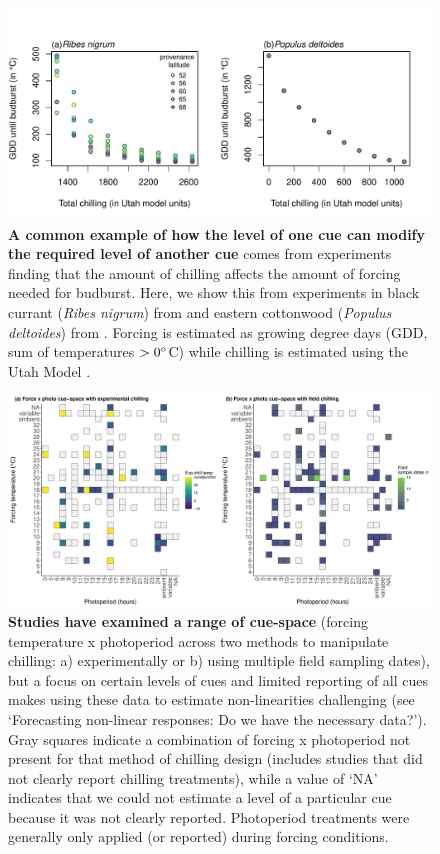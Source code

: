 \documentclass[11pt,letter]{article}
\begin{document}
\clearpage
\begin{figure}
\centering
\includegraphics[width=1\textwidth]{..//..//analyses/limitingcues/figures/gddbyutahpretty.pdf}
\caption{{\bf A common example of how the level of one cue can modify the required level of another cue} comes from experiments finding that the amount of chilling affects the amount of forcing needed for budburst. Here, we show this from experiments in black currant (\emph{Ribes nigrum}) from \citet{Sonsteby:2014aa} and eastern cottonwood (\emph{Populus deltoides}) from \citet{Thielges:1976aa}. Forcing is estimated as growing degree days (GDD, sum of temperatures $>0\degree$C) while chilling is estimated using the Utah Model \citep[see][]{richardson1974}.} %
  \label{fig:gddbyutah} 
\end{figure}


\clearpage
\begin{figure}[t!]
\centering
\includegraphics[width=1.1\textwidth]{..//..//analyses/limitingcues/figures/heatmapphotoxforcexchill2panel.pdf}
\caption{{\bf Studies have examined a range of cue-space} (forcing temperature x photoperiod across two methods to manipulate chilling: a) experimentally or b) using multiple field sampling dates), but a focus on certain levels of cues and limited reporting of all cues makes using these data to estimate non-linearities challenging (see `Forecasting non-linear responses: Do we have the necessary data?'). Gray squares indicate a combination of forcing x photoperiod not present for that method of chilling design (includes studies that did not clearly report chilling treatments), while a value of `NA' indicates that we could not estimate a level of a particular cue because it was not clearly reported. Photoperiod treatments were generally only applied (or reported) during forcing conditions.}
  \label{fig:heatmaps} 
\end{figure}
\end{document}
